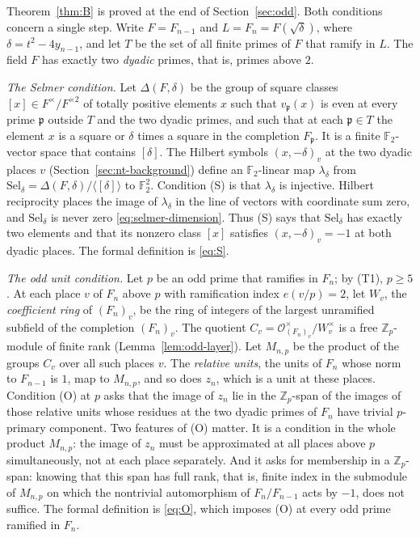\documentclass[11pt]{article}
\theoremstyle{plain}
\theoremstyle{definition}
\theoremstyle{remark}
\newcommand{\Z}{\mathbb Z}
\newcommand{\F}{\mathbb F}
\newcommand{\OO}{\mathcal O}
\begin{document}
Theorem~\ref{thm:B} is proved at the end of Section~\ref{sec:odd}.  Both conditions concern a single step.  Write
$F=F_{n-1}$ and $L=F_n=F(\sqrt\delta)$, where $\delta=t^2-4y_{n-1}$, and
let $T$ be the set of all finite primes of $F$ that ramify in $L$.  The
field $F$ has exactly two \emph{dyadic} primes, that is, primes above $2$.

\emph{The Selmer condition.}  Let $\Delta(F,\delta)$ be the group of square
classes $[x]\in F^\times/F^{\times2}$ of totally positive elements $x$ such
that $v_{\mathfrak p}(x)$ is even at every prime $\mathfrak p$ outside $T$
and the two dyadic primes, and such that at each $\mathfrak p\in T$ the
element $x$ is a square or $\delta$ times a square in the completion
$F_{\mathfrak p}$.  It is a finite $\F_2$-vector space that contains
$[\delta]$.  The Hilbert symbols $(x,-\delta)_v$ at the two dyadic places
$v$ (Section~\ref{sec:nt-background}) define an $\F_2$-linear map
$\lambda_\delta$ from $\mathrm{Sel}_\delta=\Delta(F,\delta)/\langle[\delta]\rangle$
to $\F_2^2$.  Condition (S) is that $\lambda_\delta$ is injective.  Hilbert
reciprocity places the image of $\lambda_\delta$ in the line of vectors
with coordinate sum zero, and $\mathrm{Sel}_\delta$ is never zero
\eqref{eq:selmer-dimension}.  Thus (S) says that $\mathrm{Sel}_\delta$ has
exactly two elements and that its nonzero class $[x]$ satisfies
$(x,-\delta)_v=-1$ at both dyadic places.  The formal definition is
\eqref{eq:S}.

\emph{The odd unit condition.}  Let $p$ be an odd prime that ramifies in
$F_n$; by (T1), $p\ge5$.  At each place $v$ of $F_n$ above $p$ with ramification index
$e(v/p)=2$, let $W_v$, the \emph{coefficient ring} of $(F_n)_v$, be the
ring of integers of the largest unramified subfield of the completion
$(F_n)_v$.  The quotient
$C_v=\OO_{(F_n)_v}^\times/W_v^\times$ is a free $\Z_p$-module of finite
rank (Lemma~\ref{lem:odd-layer}).  Let $M_{n,p}$ be the product of the
groups $C_v$ over all such places $v$.  The \emph{relative units}, the
units of $F_n$ whose norm to $F_{n-1}$ is $1$, map to $M_{n,p}$, and so
does $z_n$, which is a unit at these places.  Condition (O) at $p$ asks
that the image of $z_n$ lie in the $\Z_p$-span of the images of those
relative units whose residues at the two dyadic primes of $F_n$ have
trivial $p$-primary component.  Two features of (O) matter.  It is a
condition in the whole product $M_{n,p}$: the image of $z_n$ must be
approximated at all places above $p$ simultaneously, not at each place
separately.  And it asks for membership in a $\Z_p$-span: knowing that this
span has full rank, that is, finite index in the submodule of $M_{n,p}$
on which the nontrivial automorphism of $F_n/F_{n-1}$ acts by $-1$, does
not suffice.  The formal definition is \eqref{eq:O},
which imposes (O) at every odd prime ramified in $F_n$.
\end{document}
